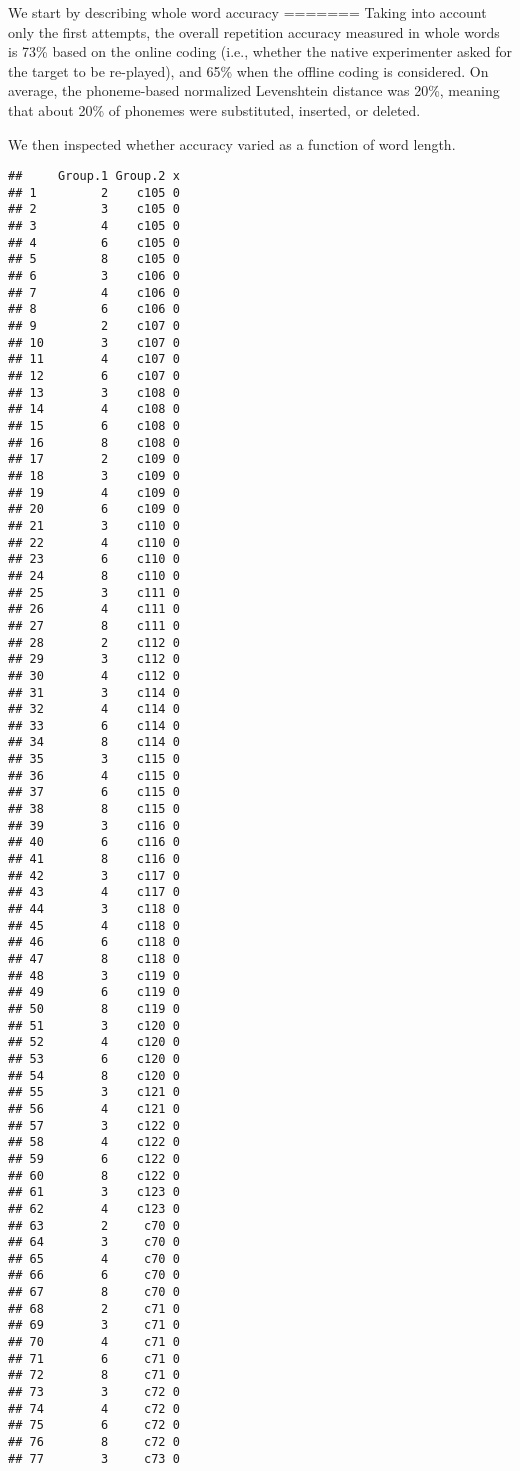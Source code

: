 \documentclass[english,,man,floatsintext]{apa6}
\begin{document}
We start by describing whole word accuracy
=======
Taking into account only the first attempts, the overall repetition accuracy measured in whole words is 73\% based on the online coding (i.e., whether the native experimenter asked for the target to be re-played), and 65\% when the offline coding is considered. On average, the phoneme-based normalized Levenshtein distance was 20\%, meaning that about 20\% of phonemes were substituted, inserted, or deleted.

We then inspected whether accuracy varied as a function of word length.

\begin{verbatim}
##     Group.1 Group.2 x
## 1         2    c105 0
## 2         3    c105 0
## 3         4    c105 0
## 4         6    c105 0
## 5         8    c105 0
## 6         3    c106 0
## 7         4    c106 0
## 8         6    c106 0
## 9         2    c107 0
## 10        3    c107 0
## 11        4    c107 0
## 12        6    c107 0
## 13        3    c108 0
## 14        4    c108 0
## 15        6    c108 0
## 16        8    c108 0
## 17        2    c109 0
## 18        3    c109 0
## 19        4    c109 0
## 20        6    c109 0
## 21        3    c110 0
## 22        4    c110 0
## 23        6    c110 0
## 24        8    c110 0
## 25        3    c111 0
## 26        4    c111 0
## 27        8    c111 0
## 28        2    c112 0
## 29        3    c112 0
## 30        4    c112 0
## 31        3    c114 0
## 32        4    c114 0
## 33        6    c114 0
## 34        8    c114 0
## 35        3    c115 0
## 36        4    c115 0
## 37        6    c115 0
## 38        8    c115 0
## 39        3    c116 0
## 40        6    c116 0
## 41        8    c116 0
## 42        3    c117 0
## 43        4    c117 0
## 44        3    c118 0
## 45        4    c118 0
## 46        6    c118 0
## 47        8    c118 0
## 48        3    c119 0
## 49        6    c119 0
## 50        8    c119 0
## 51        3    c120 0
## 52        4    c120 0
## 53        6    c120 0
## 54        8    c120 0
## 55        3    c121 0
## 56        4    c121 0
## 57        3    c122 0
## 58        4    c122 0
## 59        6    c122 0
## 60        8    c122 0
## 61        3    c123 0
## 62        4    c123 0
## 63        2     c70 0
## 64        3     c70 0
## 65        4     c70 0
## 66        6     c70 0
## 67        8     c70 0
## 68        2     c71 0
## 69        3     c71 0
## 70        4     c71 0
## 71        6     c71 0
## 72        8     c71 0
## 73        3     c72 0
## 74        4     c72 0
## 75        6     c72 0
## 76        8     c72 0
## 77        3     c73 0

\end{verbatim}
\end{document}
